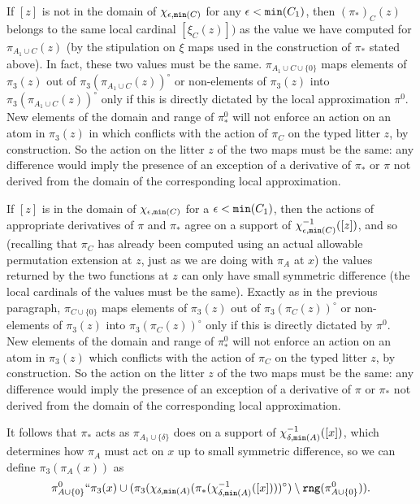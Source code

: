 \documentclass[12pt]{article}
\begin{document}
\begin{description}
If $[z]$ is not in the domain of $\chi_{\epsilon,{\tt min}(C)}$ for any $\epsilon<{\tt min}(C_1)$, then $(\pi_*)_C(z)$ belongs to the same local cardinal $[\xi_C(z)])$ as the value we have computed for $\pi_{A_1 \cup C}(z)$ (by the stipulation on $\xi$ maps used in the construction of $\pi_*$ stated above).
In fact, these two values must be the same.  $\pi_{A_1\cup C\cup \{0\}}$ maps elements of $\pi_3(z)$ out of $\pi_3(\pi_{A_1 \cup C}(z))^\circ$ or non-elements of $\pi_3(z)$ into $\pi_3(\pi_{A_1 \cup C}(z))^\circ$ only if this is directly dictated by the local approximation $\pi^0$.  New elements of the domain and range of $\pi_*^0$
will not enforce an action  on an atom in $\pi_3(z)$ in which conflicts with the action of $\pi_C$ on the typed litter $z$, by construction.  So the action on the litter $z$ of the two maps must be the same:  any difference would imply the presence of an exception
of a derivative of $\pi_*$ or $\pi$ not derived from the domain of the corresponding local approximation.

If $[z]$ is in the domain of $\chi_{\epsilon,{\tt min}(C)}$ for a $\epsilon<{\tt min}(C_1)$, then the actions of appropriate derivatives of $\pi$ and $\pi_*$ agree on a support of $\chi_{\epsilon,{\tt min}(C)}^{-1}([z])$, and so (recalling that $\pi_C$ has already
been computed using an actual allowable permutation extension at $z$, just as we are doing with $\pi_A$ at $x$) the values returned by the two functions at $z$ can only have small symmetric difference (the local cardinals of the values must be the same).  Exactly as in the previous paragraph,  $\pi_{C\cup \{0\}}$ maps elements of $\pi_3(z)$ out of $\pi_3(\pi_C(z))^\circ$ or non-elements of $\pi_3(z)$ into $\pi_3(\pi_C(z))^\circ$ only if this is directly dictated by $\pi^0$.  New elements of the domain and range of $\pi_*^0$
will not enforce an action on an atom in $\pi_3(z)$ which conflicts with the action of $\pi_C$ on the typed litter $z$, by construction.  So the action on the litter $z$ of the two maps must be the same:  any difference would imply the presence of an exception
of a derivative of $\pi$ or $\pi_*$ not derived from the domain of the corresponding local approximation.

It follows that $\pi_*$ acts as $\pi_{A_1 \cup \{\delta\}}$ does on a support of  $\chi_{\delta,{\tt min}(A)}^{-1}([x])$, which determines how $\pi_A$ must act on $x$ up to small symmetric difference, so we can define
$\pi_3(\pi_A(x))$ as $$\pi^0_{A\cup \{0\}}``\pi_3(x) \cup (\pi_3(\chi_{\delta,{\tt min}(A)}(\pi_*(\chi_{\delta,{\tt min}(A)}^{-1}([x])))^\circ) \setminus {\tt rng}(\pi^0_{A\cup \{0\}})).$$


\end{description}
\end{document}
